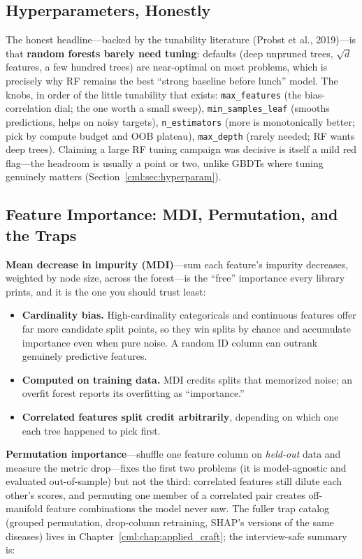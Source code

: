 \subsection{Hyperparameters, Honestly}

The honest headline---backed by the tunability literature (Probst et al., 2019)---is that \textbf{random forests barely need tuning}: defaults (deep unpruned trees, $\sqrt{d}$ features, a few hundred trees) are near-optimal on most problems, which is precisely why RF remains the best ``strong baseline before lunch'' model. The knobs, in order of the little tunability that exists: \texttt{max\_features} (the bias-correlation dial; the one worth a small sweep), \texttt{min\_samples\_leaf} (smooths predictions, helps on noisy targets), \texttt{n\_estimators} (more is monotonically better; pick by compute budget and OOB plateau), \texttt{max\_depth} (rarely needed; RF wants deep trees). Claiming a large RF tuning campaign was decisive is itself a mild red flag---the headroom is usually a point or two, unlike GBDTs where tuning genuinely matters (Section~\ref{cml:sec:hyperparam}).

\subsection{Feature Importance: MDI, Permutation, and the Traps}

\textbf{Mean decrease in impurity (MDI)}---sum each feature's impurity decreases, weighted by node size, across the forest---is the ``free'' importance every library prints, and it is the one you should trust least:
\begin{itemize}
    \item \textbf{Cardinality bias.} High-cardinality categoricals and continuous features offer far more candidate split points, so they win splits by chance and accumulate importance even when pure noise. A random ID column can outrank genuinely predictive features.
    \item \textbf{Computed on training data.} MDI credits splits that memorized noise; an overfit forest reports its overfitting as ``importance.''
    \item \textbf{Correlated features split credit arbitrarily}, depending on which one each tree happened to pick first.
\end{itemize}

\textbf{Permutation importance}---shuffle one feature column on \textit{held-out} data and measure the metric drop---fixes the first two problems (it is model-agnostic and evaluated out-of-sample) but not the third: correlated features still dilute each other's scores, and permuting one member of a correlated pair creates off-manifold feature combinations the model never saw. The fuller trap catalog (grouped permutation, drop-column retraining, SHAP's versions of the same diseases) lives in Chapter~\ref{cml:chap:applied_craft}; the interview-safe summary is:

